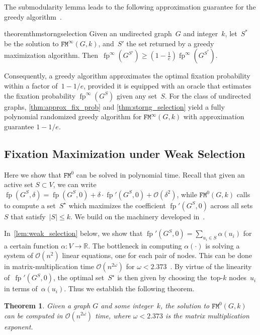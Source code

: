 \documentclass[letterpaper]{article}
\def\bigO{\mathcal{O}}
\def\R{\mathbb{R}}
\def\dfp{\fp'(G^S,0)}
\newtheorem{theorem}{Theorem}
\newcommand{\fp}{\operatorname{fp}}
\newcommand{\NodeActivationMoranStrong}{\texttt{FM}^{\infty}}
\newcommand{\NodeActivationMoranWeak}{\texttt{FM}^{0}}
\newcommand{\FitAdv}{\delta}
\begin{document}
The submodularity lemma leads to the following approximation guarantee for the greedy algorithm~\cite{Nemhauser1978,Krause2014}.

\begin{restatable}{theorem}{thmstorngselection}\label{thm:storng_selection}
Given an undirected graph~$G$ and integer~$k$, let~$S^*$ be the solution to $\NodeActivationMoranStrong(G,k)$, and~$S'$ the set returned by a greedy maximization algorithm.
Then~$\fp^{\infty}(G^{S'})\geq \left(1-\frac{1}{e}\right)\fp^{\infty}(G^{S^*})$.
\end{restatable}


Consequently, a greedy algorithm approximates the optimal fixation probability within a factor of~$1-1/e$, provided it is equipped with an oracle that estimates the fixation probability $\fp^{\infty}(G^{S})$ given any set~$S$.
For the class of undirected graphs, \cref{thm:approx_fix_prob} and \cref{thm:storng_selection} yield a fully polynomial randomized greedy algorithm for $\NodeActivationMoranStrong(G,k)$ with approximation guarantee $1-1/e$.



\subsection{Fixation Maximization under Weak Selection}\label{subsec:positive_weak}

Here we show that $\NodeActivationMoranWeak$ can be solved in polynomial time.
Recall that given an active set $S\subset V$, we can write $\fp(G^S,\FitAdv)=\fp(G^S,0)+\FitAdv\cdot \dfp + \bigO(\FitAdv^2)$, while $\NodeActivationMoranWeak(G,k)$ calls to compute a set~$S^\star$ which maximizes the coefficient $\dfp$ across all sets~$S$ that satisfy~$|S|\le k$. We build on the machinery developed in~\cite{Allen2017}.


In~\cref{lem:weak_selection} below, we show that $\fp'(G^S,0)=\sum_{u_i\in S} \alpha(u_i)$
for a certain function $\alpha\colon V\to\R$.
The bottleneck in computing $\alpha(\cdot)$ is
solving a system of
$\bigO(n^2)$
linear equations,
one for each pair of nodes.
This can be done in matrix-multiplication time %
$\bigO(n^{2\omega})$
for $\omega<2.373$~\cite{Alman2021}.
By virtue of the linearity of~$\fp'(G^S,0)$, the optimal set~$S^\star$ is then given by
choosing the~top-$k$ nodes~$u_i$ in terms of~$\alpha(u_i)$.
Thus we establish the following theorem.

\begin{theorem}\label{thm:weak_selection}
Given a graph $G$ and some integer~$k$, the solution to $\NodeActivationMoranWeak(G,k)$ can be computed in
$\bigO(n^{2\omega})$
time, where $\omega<2.373$ is the matrix multiplication exponent.
\end{theorem}
\end{document}
